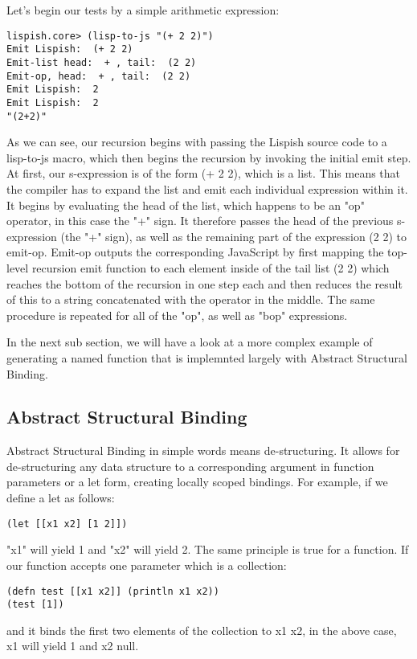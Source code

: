 Let's begin our tests by a simple arithmetic expression:
\begin{verbatim}
lispish.core> (lisp-to-js "(+ 2 2)")
Emit Lispish:  (+ 2 2)
Emit-list head:  + , tail:  (2 2)
Emit-op, head:  + , tail:  (2 2)
Emit Lispish:  2
Emit Lispish:  2
"(2+2)"
\end{verbatim}
As we can see, our recursion begins with passing the Lispish source code to a lisp-to-js macro, which then begins the recursion by invoking the initial emit step.
At first, our s-expression is of the form (+ 2 2), which is a list. This means that the compiler has to expand the list and emit each individual expression within it. It begins by evaluating the head of the list, which happens to be an "op" operator, in this case the "+" sign. 
It therefore passes the head of the previous s-expression (the "+" sign), as well as the remaining part of the expression (2 2) to emit-op. 
Emit-op outputs the corresponding JavaScript by first mapping the top-level recursion emit function to each element inside of the tail list (2 2) which reaches the bottom of the recursion in one step each and then reduces the result of this to a string concatenated with the operator in the middle.
The same procedure is repeated for all of the "op", as well as "bop" expressions.

In the next sub section, we will have a look at a more complex example of generating a named function that is implemnted largely with Abstract Structural Binding.

\subsection{Abstract Structural Binding}
Abstract Structural Binding in simple words means de-structuring. It allows for de-structuring any data structure to a corresponding argument in function parameters or a let form, creating locally scoped bindings.
For example, if we define a let as follows:
\begin{verbatim}
(let [[x1 x2] [1 2]])
\end{verbatim}
"x1" will yield 1 and "x2" will yield 2.
The same principle is true for a function.
If our function accepts one parameter which is a collection:

\begin{verbatim}
(defn test [[x1 x2]] (println x1 x2))
(test [1])
\end{verbatim}
and it binds the first two elements of the collection to x1 x2, in the above case, x1 will yield 1 and x2 null.

